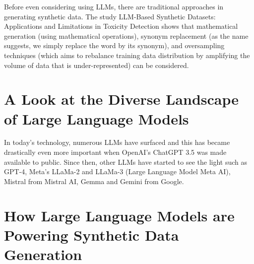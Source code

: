 Before even considering using LLMs, there are traditional approaches in generating synthetic data. The study LLM-Based Synthetic Datasets: Applications and Limitations in Toxicity Detection shows that mathematical generation (using mathematical operations), synonym replacement (as the name suggests, we simply replace the word by its synonym), and oversampling techniques (which aims to rebalance training data distribution by amplifying the volume of data that is under-represented) can be considered. 


\section{A Look at the Diverse Landscape of Large Language Models}


In today's technology, numerous LLMs have surfaced and this has became drastically even more important when OpenAI's ChatGPT 3.5 was made available to public. Since then, other LLMs have started to see the light such as GPT-4, Meta's LLaMa-2 and LLaMa-3 (Large Language Model Meta AI), Mistral from Mistral AI, Gemma and Gemini from Google.



\section{How Large Language Models are Powering Synthetic Data Generation}




